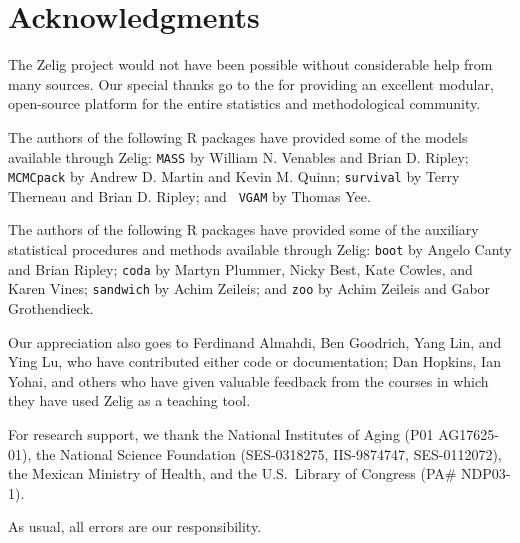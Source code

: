 \section*{Acknowledgments}  

The Zelig project would not have been possible without considerable
help from many sources.  Our special thanks go to the  for providing an
excellent modular, open-source platform for the entire statistics and
methodological community.

The authors of the following R packages have provided some of the
models available through Zelig: {\tt MASS} by William N. Venables and
Brian D. Ripley; {\tt MCMCpack} by Andrew D. Martin and Kevin M.
Quinn; {\tt survival} by Terry Therneau and Brian D. Ripley; and {\tt
  VGAM} by Thomas Yee.  

The authors of the following R packages have provided some of the
auxiliary statistical procedures and methods available through Zelig:
{\tt boot} by Angelo Canty and Brian Ripley; {\tt coda} by Martyn
Plummer, Nicky Best, Kate Cowles, and Karen Vines; {\tt sandwich} by
Achim Zeileis; and {\tt zoo} by Achim Zeileis and Gabor Grothendieck.

Our appreciation also goes to Ferdinand Almahdi, Ben Goodrich, Yang
Lin, and Ying Lu, who have contributed either code or documentation; Dan Hopkins, 
Ian Yohai, and others who have given valuable feedback from the courses in which 
they have used Zelig as a teaching tool.  

For research support, we thank the National Institutes of Aging (P01
AG17625-01), the National Science Foundation (SES-0318275,
IIS-9874747, SES-0112072), the Mexican Ministry of Health, and the
U.S.\ Library of Congress (PA\# NDP03-1).

As usual, all errors are our responsibility.


